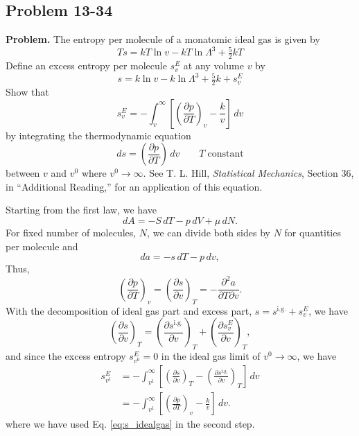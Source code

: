 \documentclass[twocolumn, 10pt]{article}
\numberwithin{equation}{section}
\newenvironment{problem}
{\par\medskip \color{problemblue}
  \textbf{Problem. }\ignorespaces}
{\medskip}
\newenvironment{solution}[1][\empty]
{\par\medskip\sffamily
  \textbf{\ifx\empty#1{Solution.}\relax\else{#1}\fi} \ignorespaces}
{\medskip}
\begin{document}
\subsection{Problem 13-34}

\begin{problem}
  The entropy per molecule of a monatomic ideal gas is given by
  \begin{equation}
  Ts = kT\ln v - kT \ln\Lambda^3 + \tfrac{5}{2}kT
    \label{eq:s_idealgas}
  \end{equation}
  Define an excess entropy per molecule $s_v^E$ at any volume $v$ by
  $$
  s = k \ln v - k \ln \Lambda^3 + \tfrac{5}{2}k + s_v^E
  $$
  Show that
  $$
  s_v^E = - \int_v^\infty \left[
    \left( \frac{ \partial p } { \partial T }
    \right)_v - \frac{k}{v} \right] \, dv
  $$
  by integrating the thermodynamic equation
  $$
  ds = \left(\frac{\partial p}{\partial T} \right) \, dv
  \qquad T \mathrm{\; constant}
  $$
  between $v$ and $v^0$ where $v^0 \to \infty$.
  See T. L. Hill, \textit{Statistical Mechanics},
  Section 36, in ``Additional Reading,''
  for an application of this equation.
\end{problem}

\begin{solution}
  Starting from the first law, we have
  $$
  dA = - S \, dT - p \, dV + \mu \, dN.
  $$
  For fixed number of molecules, $N$,
  we can divide both sides by $N$
  for quantities per molecule and
  $$
  da = - s \, dT - p \, dv,
  $$
  Thus,
  $$
  \left( \frac{ \partial p } { \partial T } \right)_v
  =
  \left( \frac{ \partial s } { \partial v } \right)_T
  =
  -\frac{ \partial^2 a } { \partial T \partial v}.
  $$
  With the decomposition of ideal gas part and excess part,
  $s = s^\mathrm{i.g.} + s_v^E$,
  we have
  $$
  \left( \frac{ \partial s } { \partial v } \right)_T
  =
  \left( \frac{ \partial s^\mathrm{i.g.} } { \partial v } \right)_T
  +
  \left( \frac{ \partial s_v^E } { \partial v } \right)_T
  ,
  $$
  and since the excess entropy $s_{v^0}^E = 0$
  in the ideal gas limit of $v^0 \to \infty$,
  we have
  \begin{align*}
    s_{v^1}^E
    &=
    -\int_{v^1}^\infty
     \left[
       \left( \frac{ \partial s } { \partial v } \right)_T
      -\left( \frac{ \partial s^\mathrm{i.g.} } { \partial v } \right)_T
     \right] \, dv
    \\
    &=
    -\int_{v^1}^\infty
     \left[
       \left( \frac{ \partial p } { \partial T } \right)_v
      -\frac{k}{v}
     \right] \, dv
    .
  \end{align*}
  where we have used Eq. \eqref{eq:s_idealgas}
  in the second step.

\end{solution}
\end{document}
